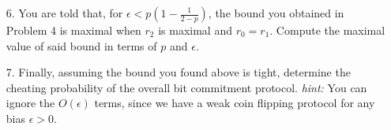 \begin{exercises}
\begin{enumerate}
\item[6.] You are told that, for $\epsilon < p(1-\frac{1}{2-p})$, the bound you obtained in Problem 4 is maximal when $r_2$ is maximal and $r_0 = r_1$. Compute the maximal value of said bound in terms of $p$ and $\epsilon$.
\item[7.] Finally, assuming the bound you found above is tight, determine the cheating probability of the overall bit commitment protocol. \textit{hint:} You can ignore the $O(\epsilon)$ terms, since we have a weak coin flipping protocol for any bias $\epsilon >0$.
\end{enumerate}

\end{exercises}
